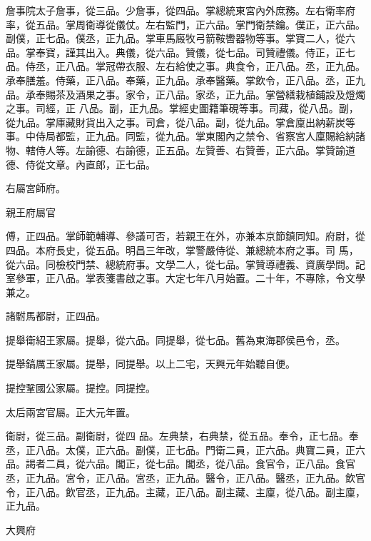 \begin{pinyinscope}
 詹事院太子詹事，從三品。少詹事，從四品。掌總統東宮內外庶務。左右衛率府率，從五品。掌周衛導從儀仗。左右監門，正六品。掌門衛禁鑰。僕正，正六品。副僕，正七品。僕丞，正九品。掌車馬廄牧弓箭鞍轡器物等事。掌寶二人，從六品。掌奉寶，謹其出入。典儀，從六品。贊儀，從七品。司贊禮儀。侍正，正七品。侍丞，正八品。掌冠帶衣服、左右給使之事。典食令，正八品。丞，正九品。承奉膳羞。侍藥，正八品。奉藥，正九品。承奉醫藥。掌飲令，正八品。丞，正九品。承奉賜茶及酒果之事。家令，正八品。家丞，正九品。掌營繕栽植鋪設及燈燭之事。司經，正
 八品。副，正九品。掌經史圖籍筆硯等事。司藏，從八品。副，從九品。掌庫藏財貨出入之事。司倉，從八品。副，從九品。掌倉廩出納薪炭等事。中侍局都監，正九品。同監，從九品。掌東閣內之禁令、省察宮人廩賜給納諸物、轄侍人等。左諭德、右諭德，正五品。左贊善、右贊善，正六品。掌贊諭道德、侍從文章。內直郎，正七品。



 右屬宮師府。



 親王府屬官



 傅，正四品。掌師範輔導、參議可否，若親王在外，亦兼本京節鎮同知。府尉，從四品。本府長史，從五品。明昌三年改，掌警嚴侍從、兼總統本府之事。司
 馬，從六品。同檢校門禁、總統府事。文學二人，從七品。掌贊導禮義、資廣學問。記室參軍，正八品。掌表箋書啟之事。大定七年八月始置。二十年，不專除，令文學兼之。



 諸駙馬都尉，正四品。



 提舉衛紹王家屬。提舉，從六品。同提舉，從七品。舊為東海郡侯邑令，丞。



 提舉鎬厲王家屬。提舉，同提舉。以上二宅，天興元年始聽自便。



 提控鞏國公家屬。提控。同提控。



 太后兩宮官屬。正大元年置。



 衛尉，從三品。副衛尉，從四
 品。左典禁，右典禁，從五品。奉令，正七品。奉丞，正八品。太僕，正六品。副僕，正七品。門衛二員，正六品。典寶二員，正六品。謁者二員，從六品。閣正，從七品。閣丞，從八品。食官令，正八品。食官丞，正九品。宮令，正八品。宮丞，正九品。醫令，正八品。醫丞，正九品。飲官令，正八品。飲官丞，正九品。主藏，正八品。副主藏、主廩，從八品。副主廩，正九品。



 大興府




\end{pinyinscope}
